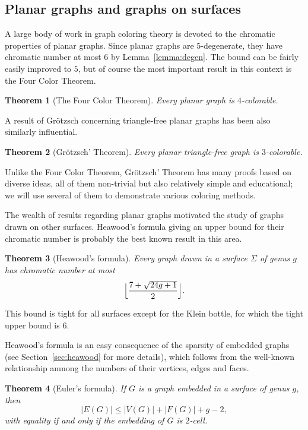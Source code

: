 \documentclass[12pt,twoside,openright,a4paper]{book}
\newtheorem{theorem}{Theorem}[chapter]
\begin{document}
\subsection{Planar graphs and graphs on surfaces}

A large body of work in graph coloring theory is devoted to the chromatic properties of planar graphs.
Since planar graphs are $5$-degenerate, they have chromatic number at most $6$ by Lemma~\ref{lemma:degen}.
The bound can be fairly easily improved to $5$, but of course the most important result in this context is
the Four Color Theorem.

\begin{theorem}[The Four Color Theorem]
Every planar graph is $4$-colorable.
\end{theorem}

A result of Gr\"{o}tzsch concerning triangle-free planar graphs has been also similarly influential.
\begin{theorem}[Gr\"{o}tzsch' Theorem]
Every planar triangle-free graph is $3$-colorable.
\end{theorem}
Unlike the Four Color Theorem, Gr\"{o}tzsch' Theorem has many proofs based on diverse ideas, all of them non-trivial but also
relatively simple and educational; we will use several of them to demonstrate various coloring methods.

The wealth of results regarding planar graphs motivated the study of graphs drawn on other surfaces.
Heawood's formula giving an upper bound for their chromatic number is probably the best known result in this area.
\begin{theorem}[Heawood's formula]
Every graph drawn in a surface $\Sigma$ of genus $g$ has chromatic number at most
$$\Bigl\lfloor\frac{7+\sqrt{24g+1}}{2}\Bigr\rfloor.$$
\end{theorem}
This bound is tight for all surfaces except for the Klein bottle, for which the tight upper bound is $6$.

Heawood's formula is an easy consequence of the sparsity of embedded graphs (see Section~\ref{sec:heawood}
for more details), which follows from the well-known relationship amnong the numbers of their vertices, edges and faces.

\begin{theorem}[Euler's formula]\label{thm:eulerfla}
If $G$ is a graph embedded in a surface of genus $g$, then
$$|E(G)|\le |V(G)|+|F(G)|+g-2,$$
with equality if and only if the embedding of $G$ is $2$-cell.
\end{theorem}
\end{document}
